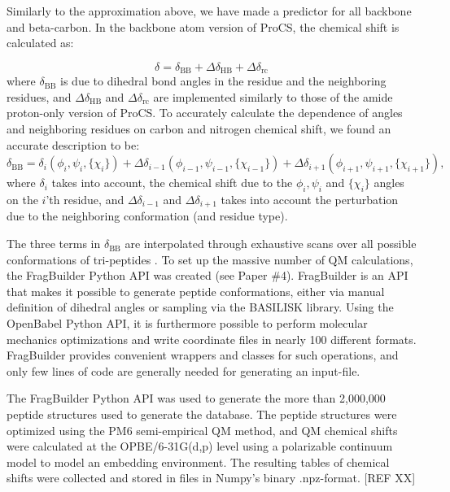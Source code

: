 Similarly to the approximation above, we have made a predictor for all backbone and beta-carbon.
In the backbone atom version of ProCS, the chemical shift is calculated as:

\begin{equation}
    \delta = \delta_\mathrm{BB} + \Delta\delta_\mathrm{HB} + \Delta\delta_\mathrm{rc}
\end{equation}
where $\delta_\mathrm{BB}$ is due to dihedral bond angles in the residue and the neighboring residues, and $\Delta\delta_\mathrm{HB}$ and $\Delta\delta_\mathrm{rc}$ are implemented similarly to those of the amide proton-only version of ProCS.
To accurately calculate the dependence of angles and neighboring residues on carbon and nitrogen chemical shift, we found an accurate description to be:
\begin{equation}
    \delta_\mathrm{BB} = \delta_{i}(\phi_i,\psi_i, \{\chi_i\})
    + \Delta\delta_{i-1}(\phi_{i-1},\psi_{i-1}, \{\chi_{i-1}\})
    + \Delta\delta_{i+1}(\phi_{i+1},\psi_{i+1}, \{\chi_{i+1}\}),
\end{equation}
where $\delta_{i}$ takes into account, the chemical shift due to the $\phi_i,\psi_i$ and $\{\chi_i\}$ angles on the $i$'th residue, and $\Delta\delta_{i-1}$ and $\Delta\delta_{i+1}$ takes into account the perturbation due to the neighboring conformation (and residue type).

The three terms in $\delta_\mathrm{BB}$ are interpolated through exhaustive scans over all possible conformations of tri-peptides
.
To set up the massive number of QM calculations, the FragBuilder Python API was created (see Paper \#4).
FragBuilder is an API that makes it possible to generate peptide conformations, either via manual definition of dihedral angles or sampling via the BASILISK library. 
Using the OpenBabel Python API, it is furthermore possible to perform molecular mechanics optimizations and write coordinate files in nearly 100 different formats.
FragBuilder provides convenient wrappers and classes for such operations, and only few lines of code are generally needed for generating an input-file.


The FragBuilder Python API was used to generate the more than 2,000,000 peptide structures used to generate the database.
The peptide structures were optimized using the PM6 semi-empirical QM method, and QM chemical shifts were calculated at the OPBE/6-31G(d,p) level using a polarizable continuum model to model an embedding environment.
The resulting tables of chemical shifts were collected and stored in files in Numpy's binary .npz-format. [REF XX]

